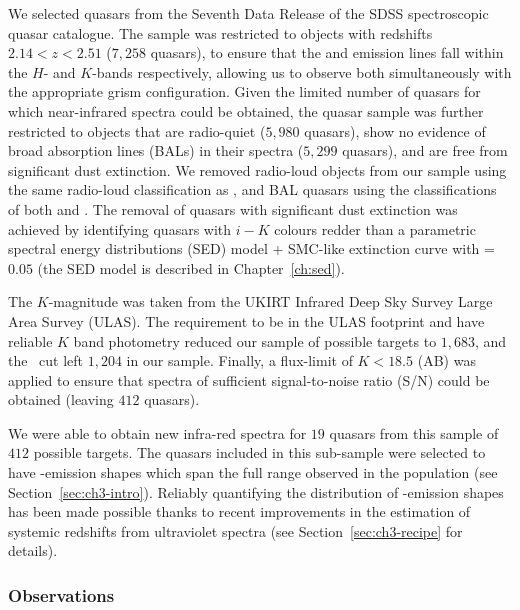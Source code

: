 We selected quasars from the Seventh Data Release \citep[DR7;][]{schneider10} of the SDSS spectroscopic quasar catalogue.  
The sample was restricted to objects with redshifts $2.14 < z <2.51$ ($7,258$ quasars), to ensure that the \hb and \ha emission lines fall within the $H$- and $K$-bands respectively, allowing us to observe both simultaneously with the appropriate grism configuration.
Given the limited number of quasars for which near-infrared spectra could be obtained, the quasar sample was further restricted to objects that are radio-quiet ($5,980$ quasars), show no evidence of broad absorption lines (BALs) in their spectra ($5,299$ quasars), and are free from significant dust extinction. 
We removed radio-loud objects from our sample using the same radio-loud classification as \citet{shen11}, and BAL quasars using the classifications of both \citet{shen11} and \citet{allen11}. 
The removal of quasars with significant dust extinction was achieved by identifying quasars with $i-K$ colours redder than a parametric spectral energy distributions (SED) model + SMC-like extinction curve with \ebv=$0.05$ (the SED model is described in Chapter~\ref{ch:sed}). 

The $K$-magnitude was taken from the UKIRT Infrared Deep Sky Survey \citep[UKIDSS;][]{lawrence07} Large Area Survey (ULAS). 
The requirement to be in the ULAS footprint and have reliable $K$ band photometry reduced our sample of possible targets to $1,683$, and the \ebv\, cut left $1,204$ in our sample. 
Finally, a flux-limit of $K<18.5$ (AB) was applied to ensure that spectra of sufficient signal-to-noise ratio (S/N) could be obtained (leaving $412$ quasars). 
 
We were able to obtain new infra-red spectra for $19$ quasars from this sample of $412$ possible targets. 
The quasars included in this sub-sample were selected to have -emission shapes which span the full range observed in the population (see Section~\ref{sec:ch3-intro}). 
Reliably quantifying the distribution of -emission shapes has been made possible thanks to recent improvements in the estimation of systemic redshifts from ultraviolet spectra (see Section~\ref{sec:ch3-recipe} for details). 

\subsubsection{Observations}

